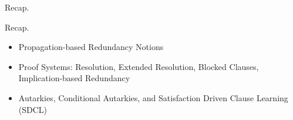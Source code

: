 \documentclass[t]{sdqbeamer}
\begin{document}
\begin{frame}{Recap.}
\begin{block}{Recap.}
\begin{itemize}\setlength{\itemsep}{1em}
    \item Propagation-based Redundancy Notions
    \item Proof Systems: Resolution, Extended Resolution, Blocked Clauses, Implication-based Redundancy
    \item Autarkies, Conditional Autarkies, and Satisfaction Driven Clause Learning (SDCL)
\end{itemize}
\end{block}
\end{frame}
\end{document}
